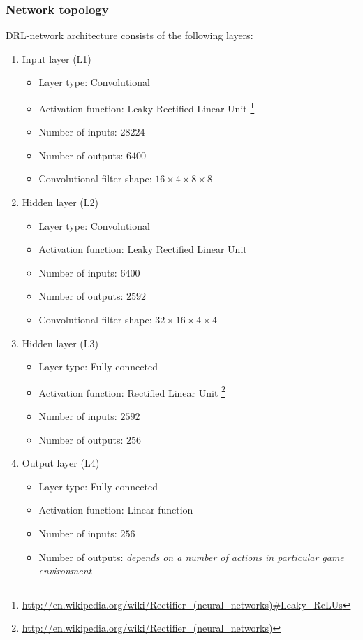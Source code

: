 \documentclass[a4paper,oneside,dvipsnames]{article}
\begin{document}
\subsubsection[Network topology]{Network topology}
DRL-network architecture consists of the following layers:
\newpage
\begin{enumerate}
    \item Input layer (L1)
        \begin{itemize}
            \item Layer type: Convolutional
            \item Activation function: Leaky Rectified Linear Unit \footnote{\url{http://en.wikipedia.org/wiki/Rectifier\_(neural_networks)\#Leaky\_ReLUs}}
            \item Number of inputs: $28224$
            \item Number of outputs: $6400$
            \item Convolutional filter shape: $16 \times 4 \times 8 \times 8$
        \end{itemize}
    \item Hidden layer (L2)
        \begin{itemize}
            \item Layer type: Convolutional
            \item Activation function: Leaky Rectified Linear Unit
            \item Number of inputs: $6400$
            \item Number of outputs: $2592$
            \item Convolutional filter shape: $32 \times 16 \times 4 \times 4$
        \end{itemize}
    \item Hidden layer (L3)
        \begin{itemize}
            \item Layer type: Fully connected
            \item Activation function: Rectified Linear Unit \footnote{\url{http://en.wikipedia.org/wiki/Rectifier\_(neural_networks)}}
            \item Number of inputs: $2592$
            \item Number of outputs: $256$
        \end{itemize}
    \item Output layer (L4)
        \begin{itemize}
            \item Layer type: Fully connected
            \item Activation function: Linear function
            \item Number of inputs: $256$
            \item Number of outputs: \textit{depends on a number of actions in particular game environment}
        \end{itemize}
\end{enumerate}
\end{document}
